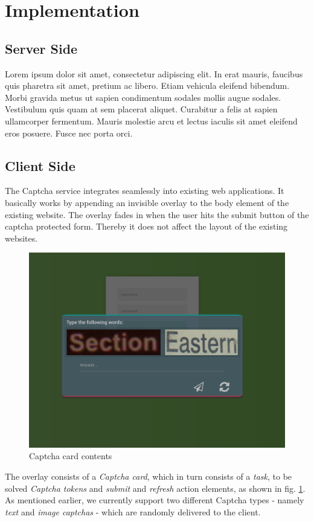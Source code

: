 \section{Implementation}
\label{sec:implementation}

\subsection{Server Side}
\label{subsec:Server Side}

Lorem ipsum dolor sit amet, consectetur adipiscing elit. In erat mauris, faucibus quis pharetra sit amet, pretium ac libero. Etiam vehicula eleifend bibendum. Morbi gravida metus ut sapien condimentum sodales mollis augue sodales. Vestibulum quis quam at sem placerat aliquet. Curabitur a felis at sapien ullamcorper fermentum. Mauris molestie arcu et lectus iaculis sit amet eleifend eros posuere. Fusce nec porta orci.

\subsection{Client Side}
\label{subsec:Client Side}
The Captcha service integrates seamlessly into existing web applications. It basically works by appending an invisible overlay to the body element of the existing website. The overlay fades in when the user hits the submit button of the captcha protected form. Thereby it does not affect the layout of the existing websites.
\begin{figure}[H]
	\centering
	\includegraphics[width=0.8\linewidth]{content/figures/captcha_words.png}
	\caption{Captcha card contents}
	\label{fig:captcha_words}
\end{figure}

 The overlay consists of a \textit{Captcha card}, which in turn consists of a \textit{task}, to be solved \textit{Captcha tokens} and \textit{submit} and \textit{refresh} action elements, as shown in fig. \ref{fig:captcha_words}. As mentioned earlier, we currently support two different Captcha types - namely \textit{text} and \textit{image captchas} - which are randomly delivered to the client. 
 
